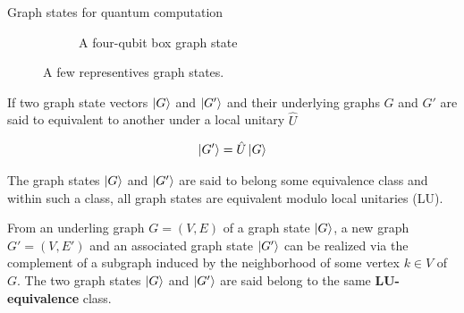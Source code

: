 \documentclass[final]{beamer}
\newlength{\colwidth}
\begin{document}
\begin{frame}[t]
\begin{columns}[t]
\begin{column}{\colwidth}
\begin{block}{Graph states for quantum computation}
\begin{figure}[H]
\begin{subfigure}[b]{0.40\textwidth}
                            \label{fig:linear_cluster_4q}
                        \end{subfigure}
                        \begin{subfigure}[b]{0.40\textwidth}
                            \centering
                            \caption{A four-qubit box graph state}
                            \label{fig:box_cluster_4q}
                        \end{subfigure}
                        \caption{A few representives graph states. }
                        \label{fig:graph_states}
                    \end{figure}

                    If two graph state vectors $\ket{G}$ and $\ket{G'}$  and their
                    underlying graphs $G$ and  $G'$ are said to
                    equivalent to another under a local unitary $\hat{U}$ 

                    \begin{align}
                        \ket{G'} = \hat{U}\ket{G}
                        \label{eq:graph_state_unitary_equivalence}
                    \end{align}

                    The graph states $\ket{G}$ and  $\ket{G'}$ are said to belong some
                    equivalence class and within such a class, all graph states are
                    equivalent modulo local unitaries (LU). 


                    From an underling graph $G = (V, E)$ of a graph state $\ket{G}$, a new
                    graph $G' = (V, E')$ and an associated graph state $\ket{G'}$ can be
                    realized via the complement of a subgraph induced by the neighborhood of some vertex $k
                    \in V$ of $G$. The two graph states $\ket{G}$ and $\ket{G'}$ are said belong to the same
                    \textbf{LU-equivalence} class.
                \end{block}
            \end{column}


\end{columns}
\end{frame}
\end{document}
